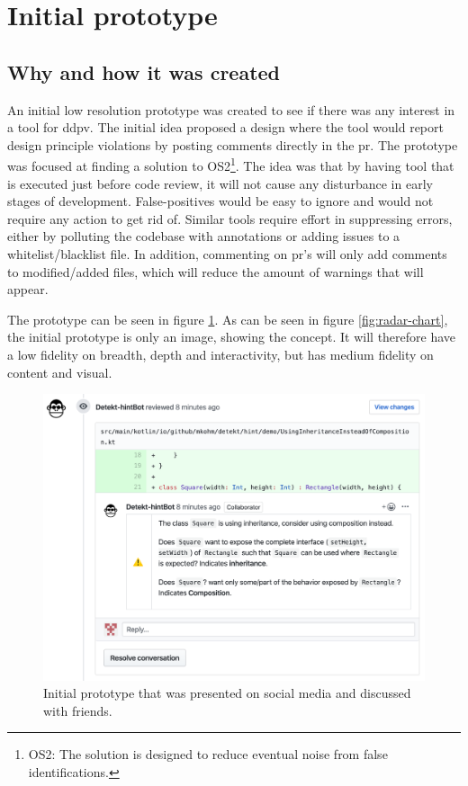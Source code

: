 \documentclass{report}
\begin{document}
\section{Initial prototype}
\label{initial-prototype}
\subsection*{Why and how it was created}
An initial low resolution prototype was created to see if there was any interest in a tool for \gls{ddpv}. The initial idea proposed a design where the tool would report design principle violations by posting comments directly in the \gls{pr}. The prototype was focused at finding a solution to OS2\footnote{OS2: The solution is designed to reduce eventual noise from false identifications.}. The idea was that by having tool that is executed just before code review, it will not cause any disturbance in early stages of development. False-positives would be easy to ignore and would not require any action to get rid of. Similar tools require effort in suppressing errors, either by polluting the codebase with annotations or adding issues to a whitelist/blacklist file. In addition, commenting on \gls{pr}'s will only add comments to modified/added files, which will reduce the amount of warnings that will appear.  

The prototype can be seen in figure \ref{fig:mockup}. As can be seen in figure \ref{fig:radar-chart}, the initial prototype is only an image, showing the concept. It will therefore have a low fidelity on breadth, depth and interactivity, but has medium fidelity on content and visual. 


\begin{figure}[h!]
    \centering
    \includegraphics[width=\textwidth]{../images/demo.png}
    \caption{Initial prototype that was presented on social media and discussed with friends.}
    \label{fig:mockup}
\end{figure}
\end{document}
